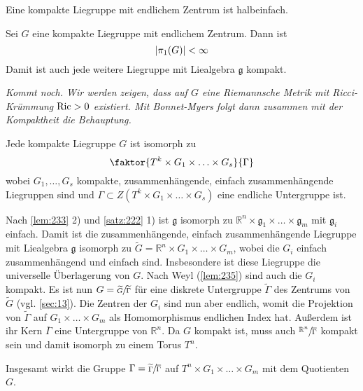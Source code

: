 \begin{korollarB}[{name=[kompakte Liegruppe mit endlichem Zentrum halbeinfach]}]
	Eine kompakte Liegruppe mit endlichem Zentrum ist halbeinfach.
\end{korollarB}

\begin{lemma}[{name={Weyl}},label=lem:235]
	Sei $G$ eine kompakte Liegruppe mit endlichem Zentrum.
	Dann ist 
	\[
		\abs*{\pi_1(G)} < \infty
	\]
	Damit ist auch jede weitere Liegruppe mit Liealgebra $\mathfrak{g}$ kompakt.
\end{lemma}
\begin{beweis}
	\emph{Kommt noch. Wir werden zeigen, dass auf $G$ eine Riemannsche Metrik mit Ricci-Krümmung $\Ric >0$ existiert. Mit Bonnet-Myers folgt dann zusammen mit der Kompaktheit die Behauptung.}
\end{beweis}

\begin{korollar}[{name=[Isomorphie kompakte Liegruppe]}]
	Jede kompakte Liegruppe $G$ ist isomorph zu 
	\[
		\faktor{T^k \times G_1 \times \ldots \times G_s}{\Gamma}
	\]
	wobei $G_1, \ldots ,G_s$ kompakte, zusammenhängende, einfach zusammenhängende Liegruppen sind und $\Gamma \subset Z(T^k \times G_1 \times \ldots \times G_s)$ eine endliche Untergruppe ist.
\end{korollar}
\begin{beweis}
	Nach \autoref{lem:233} 2) und \autoref{satz:222} 1) ist $\mathfrak{g}$ isomorph zu $\mathbb{R}^n \times \mathfrak{g}_1 \times \ldots \times \mathfrak{g}_m$ mit $\mathfrak{g}_i$ einfach.
	Damit ist die zusammenhängende, einfach zusammenhängende Liegruppe mit Liealgebra $\mathfrak{g}$ isomorph zu $\widetilde{G} = \mathbb{R}^n \times G_1 \times \ldots \times G_m$, wobei die $G_i$ einfach zusammenhängend und einfach sind. 
	Insbesondere ist diese Liegruppe die universelle Überlagerung von $G$.
	Nach Weyl (\autoref{lem:235}) sind auch die $G_i$ kompakt.
	Es ist nun $G = \sfrac{\widetilde{G}}{\widetilde{\Gamma}}$ für eine diskrete Untergruppe $\widetilde{\Gamma}$ des Zentrums von $\widetilde{G}$ (vgl. \cref{sec:13}).
	Die Zentren der $G_i$ sind nun aber endlich, womit die Projektion von $\widetilde{\Gamma}$ auf $G_1\times \ldots \times G_m$ als Homomorphismus endlichen Index hat.
	Außerdem ist ihr Kern $\overline{\Gamma}$ eine Untergruppe von $\mathbb{R}^n$.
	Da $G$ kompakt ist, muss auch $\sfrac{\mathbb{R}^n}{\overline{\Gamma}}$ kompakt sein und damit isomorph zu einem Torus $T^n$.
	
	Insgesamt wirkt die Gruppe $\Gamma = \sfrac{\widetilde{\Gamma}}{\overline{\Gamma}}$ auf $T^n \times G_1 \times \ldots \times G_m$ mit dem Quotienten $G$.
\end{beweis}

